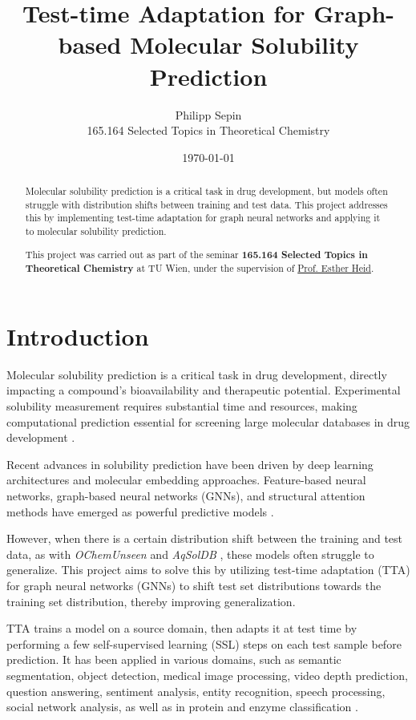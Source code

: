 \documentclass[11pt,a4paper]{article}
\title{Test-time Adaptation for Graph-based Molecular Solubility Prediction}
\author{Philipp Sepin\\
        165.164 Selected Topics in Theoretical Chemistry}
\date{\today}
\begin{document}
\maketitle

\begin{abstract}
        Molecular solubility prediction is a critical task in drug development, but models often struggle with distribution shifts between training and test data. This project addresses this by implementing test-time adaptation for graph neural networks and applying it to molecular solubility prediction.

        This project was carried out as part of the seminar \textbf{165.164 Selected Topics in Theoretical Chemistry} at TU Wien, under the supervision of \href{https://hesther.github.io/}{Prof. Esther Heid}.
\end{abstract}

\section{Introduction}
Molecular solubility prediction is a critical task in drug development, directly impacting a compound's bioavailability and therapeutic potential. Experimental solubility measurement requires substantial time and resources, making computational prediction essential for screening large molecular databases in drug development \cite{llompart2024will}.

Recent advances in solubility prediction have been driven by deep learning architectures and molecular embedding approaches. Feature-based neural networks, graph-based neural networks (GNNs), and structural attention methods have emerged as powerful predictive models \cite{llompart2024will}.

However, when there is a certain distribution shift between the training and test data, as with \textit{OChemUnseen} \cite{llompart2024will} and \textit{AqSolDB} \cite{sorkun2019aqsoldb}, these models often struggle to generalize. This project aims to solve this by utilizing test-time adaptation (TTA) for graph neural networks (GNNs) to shift test set distributions towards the training set distribution, thereby improving generalization.

TTA trains a model on a source domain, then adapts it at test time by performing a few self-supervised learning (SSL) steps on each test sample before prediction. It has been applied in various domains, such as semantic segmentation, object detection, medical image processing, video depth prediction, question answering, sentiment analysis, entity recognition, speech processing, social network analysis, as well as in protein and enzyme classification \cite{liang2025comprehensive,cui2025online}.
\end{document}
